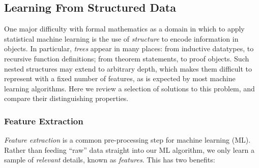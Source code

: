 

\fi

\subsection{Learning From Structured Data}

One major difficulty with formal mathematics as a domain in which to apply
statistical machine learning is the use of \emph{structure} to encode
information in objects. In particular, \emph{trees} appear in many places: from
inductive datatypes, to recursive function definitions; from theorem statements,
to proof objects. Such nested structures may extend to arbitrary depth, which
makes them difficult to represent with a fixed number of features, as is
expected by most machine learning algorithms. Here we review a selection of
solutions to this problem, and compare their distinguishing properties.

\subsubsection{Feature Extraction}\label{sec:featureextraction}

\emph{Feature extraction} is a common pre-processing step for machine learning
(ML). Rather than feeding ``raw'' data straight into our ML algorithm, we only
learn a sample of \emph{relevant} details, known as \emph{features}. This has
two benefits:

